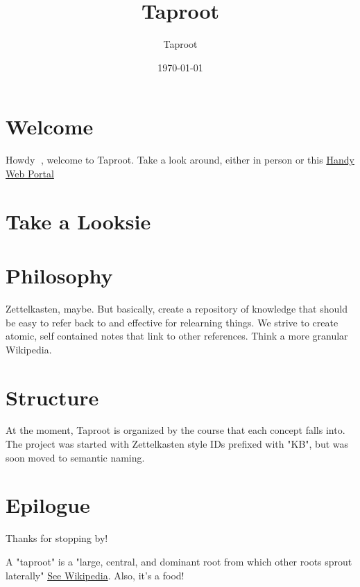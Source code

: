 \documentclass[letterpaper]{article}
\author{Taproot}
\date{\today}
\title{Taproot}
\renewcommand\maketitle{}
\begin{document}
\maketitle

\section{Welcome}
\label{sec:org749a7a6}
Howdy 👋, welcome to Taproot. Take a look around, either in person or this \href{https://taproot3.sanity.gq}{Handy Web Portal}

\section{Take a Looksie}
\label{sec:org434484a}

\section{Philosophy}
\label{sec:org1db14da}
Zettelkasten, maybe. But basically, create a repository of knowledge that should be easy to refer back to and effective for relearning things.
We strive to create atomic, self contained notes that link to other references. Think a more granular Wikipedia.

\section{Structure}
\label{sec:orgf7a29bc}
At the moment, Taproot is organized by the course that each concept falls into.
The project was started with Zettelkasten style IDs prefixed with "KB", but was soon moved to semantic naming.

\section{Epilogue}
\label{sec:org5763f58}

Thanks for stopping by!

A "taproot" is a "large, central, and dominant root from which other roots sprout laterally" \href{https://en.wikipedia.org/wiki/Taproot}{See Wikipedia}. Also, it's a food!
\end{document}
